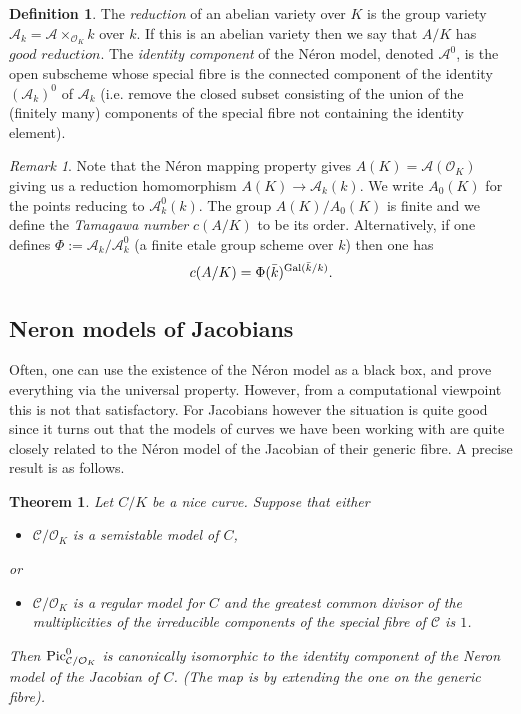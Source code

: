 \documentclass[12pt]{amsart}
\numberwithin{equation}{section}
\newtheorem{theorem}[equation]{Theorem}
\theoremstyle{remark}
\newtheorem{remark}[equation]{Remark}
\theoremstyle{definition}
\theoremstyle{definition}
\theoremstyle{definition}
\newtheorem{defi}[equation]{Definition}
\theoremstyle{definition}
\theoremstyle{definition}
\theoremstyle{definition}
\begin{document}
\begin{defi}
The \textit{reduction} of an abelian variety over $K$ is the group variety $\mathcal{A}_k=\mathcal{A}\times_{\mathcal{O}_K}k$ over $k$. If this is an abelian variety then we say that $A/K$ has $\textit{good reduction}$. The \textit{identity component} of the N\'{e}ron model, denoted $\mathcal{A}^0$, is the open subscheme whose special fibre is the connected component of the identity $(\mathcal{A}_k)^0$ of $\mathcal{A}_k$ (i.e. remove the closed subset consisting of the union of the (finitely many) components of the special fibre not containing the identity element).   
\end{defi}

\begin{remark}
Note that the N\'{e}ron mapping property gives $A(K)=\mathcal{A}(\mathcal{O}_K)$ giving us a reduction homomorphism $A(K)\rightarrow \mathcal{A}_k(k)$. We write $A_0(K)$ for the points reducing to $\mathcal{A}_k^0(k)$. The group $A(K)/A_0(K)$ is finite and we define the \textit{Tamagawa number} $c(A/K)$ to be its order. Alternatively, if one defines $\Phi:=\mathcal{A}_k/\mathcal{A}_k^0$ (a finite etale group scheme over $k$) then one has
\[c(A/K)=\Phi(\bar{k})^{\textup{Gal}(\bar{k}/k)}.\] 
\end{remark}

\subsection{Neron models of Jacobians}

Often, one can use the existence of the N\'{e}ron model as a black box, and prove everything via the universal property. However, from a computational viewpoint this is not that satisfactory. For Jacobians however the situation is quite good since it turns out that the models of curves we have been working with are quite closely related to the N\'{e}ron  model of the Jacobian of their generic fibre. A precise result is as follows.

\begin{theorem} \label{raynauds theorem}
Let $C/K$ be a nice curve. Suppose that either
\begin{itemize}
\item $\mathcal{C}/\mathcal{O}_K$ is a semistable model of $C$,
\end{itemize}
or
\begin{itemize}
\item $\mathcal{C}/\mathcal{O}_K$ is a regular model for $C$ and the greatest common divisor of the multiplicities of the irreducible components of the special fibre of $\mathcal{C}$ is $1$.
\end{itemize}

Then $\textup{Pic}^0_{\mathcal{C}/\mathcal{O}_K}$ is canonically isomorphic to the identity component of the Neron model of the Jacobian of $C$. (The map is by extending the one on the generic fibre). 
\end{theorem}
\end{document}
